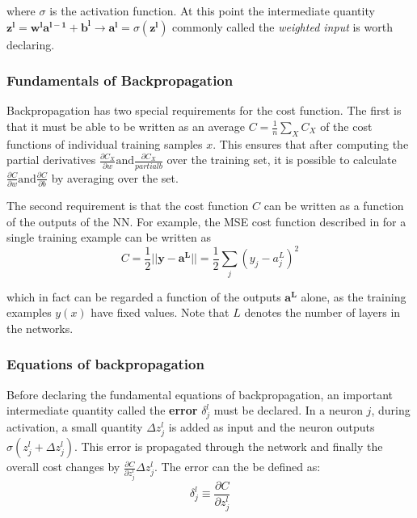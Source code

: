 where $\sigma$ is the activation function. At this point the
intermediate quantity $\bm{z^l} = \bm{w^la^{l-1}} + \bm{b^l}
\rightarrow \bm{a^l} = \sigma(\bm{z^l})$ commonly called the
\textit{weighted input} is worth declaring.

\subsubsection*{Fundamentals of Backpropagation}

Backpropagation has two special requirements for the
cost function. The first is that it must be able to be
written as an average $C = \frac{1}{n} \sum_XC_X$ of the
cost functions of individual training samples $x$. This
ensures that after computing the partial derivatives
$\frac{\partial C_X}{\partial w} \text{and} \frac{\partial C_X}{partial b}$
over the training set, it is possible to calculate 
$\frac{\partial C}{\partial w} \text{and} \frac{\partial C}{\partial b}$
by averaging over the set.

The second requirement is that the cost function $C$ can be
written as a function of the outputs of the NN. For example,
the MSE cost function described in 
for a single training example can be written as
\begin{equation}
  \label{eq:backprop_mse}
  C = \frac{1}{2}||\bm{y} - \bm{a^L}|| = \frac{1}{2}\sum_j(y_j - a^L_j)^2
\end{equation}

which in fact can be regarded a function of the outputs $\bm{a^L}$ alone,
as the training examples $y(x)$ have fixed values. Note that $L$ denotes the
number of layers in the networks.

\subsubsection*{Equations of backpropagation}

Before declaring the fundamental equations of backpropagation,
an important intermediate quantity called the \textbf{error} $\delta_j^l$
must be declared. In a neuron $j$, during activation, a small quantity $\Delta z_j^l$
is added as input and the neuron outputs $\sigma (z^l_j + \Delta z_j^l)$.
This error is propagated through the network and finally
the overall cost changes by $\frac{\partial C}{\partial z_j^l}\Delta z_j^l$.
The error can the be defined as:
\begin{equation}
  \label{eq:error_nn}
  \delta_j^l \equiv \frac{\partial C}{\partial z_j^l}
\end{equation}


